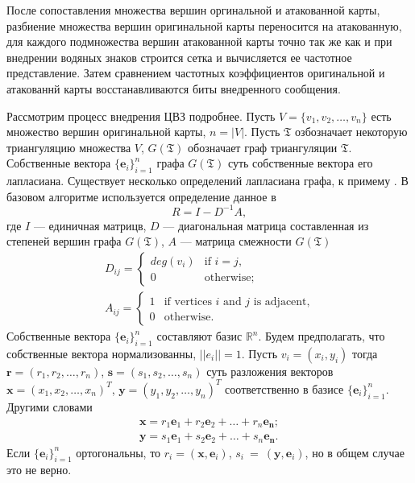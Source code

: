 После сопоставления множества вершин оргинальной и атакованной карты, разбиение множества
вершин оригинальной карты переносится на атакованную, для каждого подмножества вершин атакованной
карты точно так же как и при внедрении водяных знаков строится сетка и вычисляется ее частотное
представление. Затем сравнением частотных коэффициентов оригинальной и атакованнй карты
восстанавливаются биты внедренного сообщения. 

Рассмотрим процесс внедрения ЦВЗ подробнее.  
Пусть $V = \{v_1, v_2, \dots, v_n\}$ есть множество вершин оригинальной карты, $n = |V|$. 
Пусть $\mathfrak{T}$ озбозначает некоторую триангуляцию множества $V$, $G(\mathfrak{T})$ обозначает 
граф триангуляции $\mathfrak{T}$. Собственные вектора $\{\mathbf{e}_i\}_{i=1}^n$ графа $G(\mathfrak{T})$ суть 
собственные вектора его лапласиана. 
Существует несколько определений лапласиана графа, к примему \cite{Biggs, Chung, Zhang}. В базовом алгоритме 
используется определение данное в \cite{Biggs}
$$R = I - D^{-1} A,$$ где $I$ --- единичная матрицв, $D$ --- диагональная матрица составленная из 
степеней вершин графа $G(\mathfrak{T})$, $A$ --- матрица смежности $G(\mathfrak{T})$
\begin{eqnarray*}
  D_{ij} = \begin{cases} deg(v_i) &\text{if $i = j$,} \\ 0 &\text{otherwise;} \end{cases} \\
  A_{ij} = \begin{cases} 1 &\text{if vertices $i$ and $j$ is adjacent,} \\ 0 &\text{otherwise.} \end{cases} 
\end{eqnarray*}
Собственные вектора $\{\mathbf{e}_i\}_{i=1}^n$ составляют базис $\mathbb{R}^n$. Будем предполагать, что 
собственные вектора нормализованны, $||e_i|| = 1$. 
Пусть $v_i = (x_i, y_i)$ тогда $\mathbf{r} = (r_1, r_2, \dots, r_n)$, $\mathbf{s} = (s_1, s_2, \dots, s_n)$ 
суть разложения векторов $\mathbf{x} = (x_1, x_2, \dots, x_n)^T$, $\mathbf{y} = (y_1, y_2, \dots, y_n)^T$ 
соответственно в базисе $\{\mathbf{e}_i\}_{i=1}^n$. Другими словами 
\begin{eqnarray*}
  \mathbf{x} = r_1 \mathbf{e}_1 + r_2 \mathbf{e}_2 + \dots + r_n \mathbf{e_n}; \\ 
  \mathbf{y} = s_1 \mathbf{e}_1 + s_2 \mathbf{e}_2 + \dots + s_n \mathbf{e_n}.  
\end{eqnarray*}
Если $\{\mathbf{e}_i\}_{i=1}^n$ ортогональны, то $r_i = (\mathbf{x}, \mathbf{e}_i)$, 
$s_i~=~(\mathbf{y}, \mathbf{e}_i)$, но в общем случае это не верно. 

